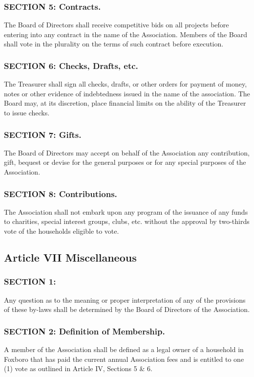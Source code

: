 \subsubsection{SECTION 5: Contracts.}
The Board of Directors shall receive competitive bids on all projects
before entering into any contract in the name of the Association. Members
of the Board shall vote in the plurality on the terms of such contract
before execution.

\subsubsection{SECTION 6: Checks, Drafts, etc.}
The Treasurer shall sign all checks, drafts, or other orders for payment
of money, notes or other evidence of indebtedness issued in the name
of the association. The Board may, at its discretion, place financial
limits on the ability of the Treasurer to issue checks.

\subsubsection{SECTION 7: Gifts.}
The Board of Directors may accept on behalf of the Association any
contribution, gift, bequest or devise for the general purposes or for
any special purposes of the Association.

\subsubsection{SECTION 8: Contributions.}
The Association shall not embark upon any program of the issuance of
any funds to charities, special interest groups, clubs, etc. without
the approval by two-thirds vote of the households eligible to vote.

\subsection{Article VII Miscellaneous}

\subsubsection{SECTION 1:}
Any question as to the meaning or proper interpretation of any of the
provisions of these by-laws shall be determined by the Board of Directors
of the Association.

\subsubsection{SECTION 2: Definition of Membership.}
A member of the Association shall be defined as a legal owner of a
household in Foxboro that has paid the current annual Association fees and
is entitled to one (1) vote as outlined in Article IV, Sections 5 \& 6.

